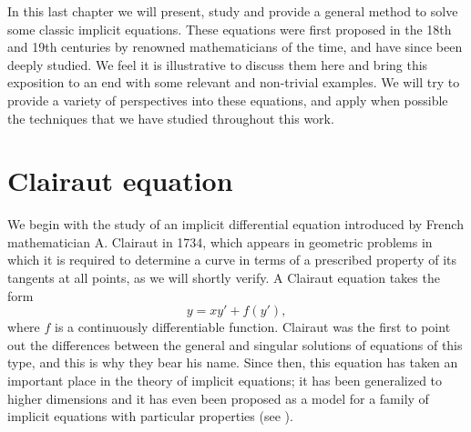 %
%
%

In this last chapter we will present, study and provide a general method to solve some classic implicit equations. These equations were first proposed in the 18th and 19th centuries by renowned mathematicians of the time, and have since been deeply studied. We feel it is illustrative to discuss them here and bring this exposition to an end with some relevant and non-trivial examples. We will try to provide a variety of perspectives into these equations, and apply when possible the techniques that we have studied throughout this work.

\section{Clairaut equation}

We begin with the study of an implicit differential equation introduced by French mathematician A. Clairaut in 1734, which appears in geometric problems in which it is required to determine a curve in terms of a prescribed property of its tangents at all points, as we will shortly verify. A Clairaut equation takes the form
\begin{equation}  \label{eq:clairaut}
  y=xy' + f(y'),
\end{equation}
where $f$ is a continuously differentiable function. Clairaut was the first to point out the differences between the general and singular solutions of equations of this type, and this is why they bear his name. Since then, this equation has taken an important place in the theory of implicit equations; it has been generalized to higher dimensions and it has even been proposed as a model for a family of implicit equations with particular properties (see \cite{dara1975singularites}).


